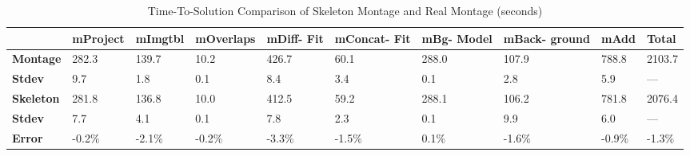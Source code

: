 \documentclass[preprint,12pt]{elsarticle}
\newcommand{\katznote}[1]{ {\textcolor{blue}    { ***Dan:   #1 }}}
\newcommand{\zhaonote}[1]{{\textcolor{cyan}{ ***Zhao:  #1 }}}
\newcommand{\katznote}[1]{}
\newcommand{\zhaonote}[1]{}
\newcommand{\B}[1]{\textbf{#1}\xspace}
\newcommand{\HF}{\hfill}
\begin{document}
\begin{table}[]
\begin{center}
    \caption{Time-To-Solution Comparison of Skeleton Montage and Real Montage (seconds)}
    \begin{scriptsize}
        \begin{tabular}{ @{} p{1.4cm}@{}p{1.10cm} p{1.00cm} p{1.3cm} p{0.80cm} p{1.2cm} p{0.9cm} p{1.1cm} p{0.75cm} p{0.9cm} @{}}
    \toprule
    & \B{mProject} & \B{mImgtbl} & \B{mOverlaps} & \B{mDiff- Fit} & \B{mConcat- Fit} & \B{mBg- Model} & \B{mBack- ground} & \B{mAdd}     & \B{Total}   \\
    \midrule
    \B{Montage } & \HF 282.3   & \HF 139.7   & \HF 10.2      & \HF 426.7      & \HF 60.1         & \HF 288.0      & \HF 107.9         &  \HF 788.8   & \HF 2103.7  \\
    \B{Stdev   } & \HF   9.7   & \HF   1.8   & \HF  0.1      & \HF   8.4      & \HF  3.4         & \HF   0.1      & \HF   2.8         &  \HF   5.9   & \HF    ---  \\
    \B{Skeleton} & \HF 281.8   & \HF 136.8   & \HF 10.0      & \HF 412.5      & \HF 59.2         & \HF 288.1      & \HF 106.2         &  \HF 781.8   & \HF 2076.4  \\
    \B{Stdev   } & \HF   7.7   & \HF   4.1   & \HF  0.1      & \HF   7.8      & \HF  2.3         & \HF   0.1      & \HF   9.9         &  \HF   6.0   & \HF    ---  \\
    \B{Error   } & \HF  -0.2\% & \HF -2.1\%  & \HF -0.2\%    & \HF  -3.3\%    & \HF -1.5\%       & \HF   0.1\%    & \HF  -1.6\%       &  \HF  -0.9\% & \HF   -1.3\%\\
    \bottomrule
    \end{tabular}
    \end{scriptsize}
    \label{tb:montage-results}
\end{center}   
\end{table}


\end{document}
